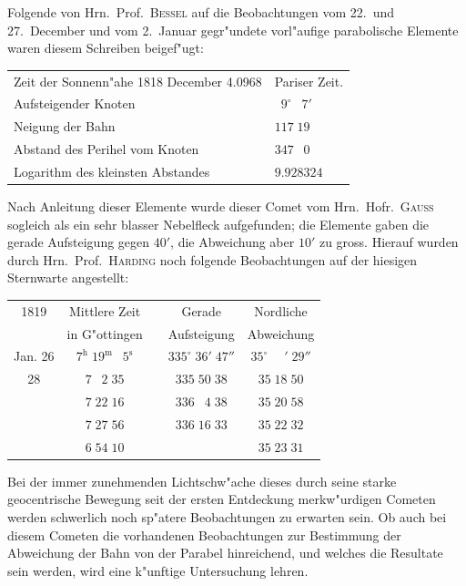 \documentclass[12pt,a4paper]{article}
\begin{document}
\newpage

Folgende von Hrn.~Prof.~\textsc{Bessel} auf die Beobachtungen vom 22.~und 27.~December und vom
2.~Januar gegr"undete vorl"aufige parabolische Elemente waren diesem Schreiben beigef"ugt:

\begin{center}
\begin{tabular}{l@{\dotfill}l}
Zeit der Sonnenn"ahe 1818 December 4.0968 & Pariser Zeit. \\
Aufsteigender Knoten & $\phantom{0}9^{\circ}\;\phantom{0}7'$ \\
Neigung der Bahn & $117\;19$ \\
Abstand des Perihel vom Knoten & $347\;\phantom{0}0$ \\
Logarithm des kleinsten Abstandes & $9.928324$ \\
\end{tabular}
\end{center}

Nach Anleitung dieser Elemente wurde dieser Comet vom Hrn.~Hofr.~\textsc{Gauss} sogleich als ein sehr
blasser Nebelfleck aufgefunden; die Elemente gaben die gerade Aufsteigung gegen $40'$, die Abweichung
aber $10'$ zu gross. Hierauf wurden durch Hrn.~Prof.~\textsc{Harding} noch folgende Beobachtungen auf der
hiesigen Sternwarte angestellt:

\begin{center}
\small
\begin{tabular}{c|c|c|c|c}
\toprule
1819 & Mittlere Zeit & & Gerade & Nordliche \\
& in G"ottingen & & Aufsteigung & Abweichung \\
\midrule
Jan. 26 & $7^{\mathrm{h}}\;19^{\mathrm{m}}\;\phantom{0}5^{\mathrm{s}}$ & & $335^{\circ}\;36'\;47''$ & $35^{\circ}\;\phantom{0}\phantom{0}'\;29''$ \\
\phantom{26} 28 & $7\;\phantom{0}2\;35$ & & $335\;50\;38$ & $35\;18\;50$ \\
\phantom{26} & $7\;22\;16$ & & $336\;\phantom{0}4\;38$ & $35\;20\;58$ \\
\phantom{26} & $7\;27\;56$ & & $336\;16\;33$ & $35\;22\;32$ \\
\phantom{26} & $6\;54\;10$ & & & $35\;23\;31$ \\
\bottomrule
\end{tabular}
\end{center}

Bei der immer zunehmenden Lichtschw"ache dieses durch seine starke geocentrische Bewegung seit
der ersten Entdeckung merkw"urdigen Cometen werden schwerlich noch sp"atere Beobachtungen zu erwarten
sein. Ob auch bei diesem Cometen die vorhandenen Beobachtungen zur Bestimmung der Abweichung der
Bahn von der Parabel hinreichend, und welches die Resultate sein werden, wird eine k"unftige Untersuchung
lehren.
\end{document}
